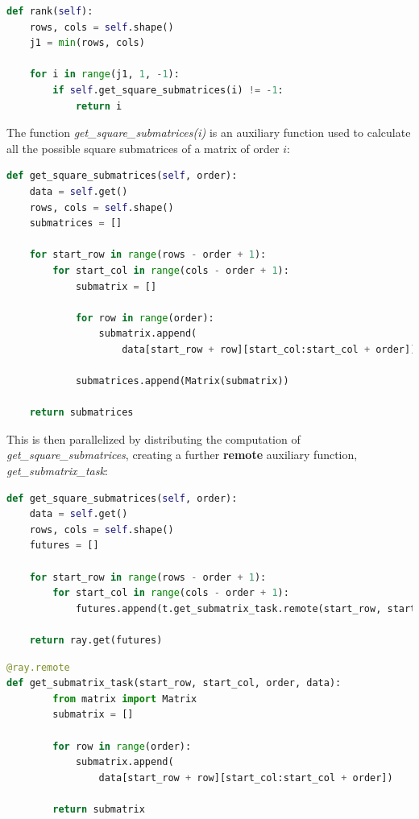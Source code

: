 \begin{lstlisting}[language=Python, caption={Rank function}]
def rank(self):
    rows, cols = self.shape()
    j1 = min(rows, cols)

    for i in range(j1, 1, -1):
        if self.get_square_submatrices(i) != -1:
            return i    
\end{lstlisting}
The function \textit{get\_square\_submatrices(i)} is an auxiliary function used to calculate all the possible square submatrices of a matrix of order $i$:
\begin{lstlisting}[language=Python, caption={get\_square\_submatrices}]
def get_square_submatrices(self, order):
    data = self.get()
    rows, cols = self.shape()
    submatrices = []

    for start_row in range(rows - order + 1):
        for start_col in range(cols - order + 1):
            submatrix = []

            for row in range(order):
                submatrix.append(
                    data[start_row + row][start_col:start_col + order])

            submatrices.append(Matrix(submatrix))

    return submatrices
\end{lstlisting}
This is then parallelized by distributing the computation of \textit{get\_square\_submatrices},  creating a further \textbf{remote} auxiliary function, \textit{get\_submatrix\_task}:
\begin{lstlisting}[language=Python, caption={get\_square\_submatrices}]
def get_square_submatrices(self, order):
    data = self.get()
    rows, cols = self.shape()
    futures = []

    for start_row in range(rows - order + 1):
        for start_col in range(cols - order + 1):            
            futures.append(t.get_submatrix_task.remote(start_row, start_col, order, data))

    return ray.get(futures)
\end{lstlisting}

\begin{lstlisting}[language=Python, caption={get\_submatrix\_task}]
@ray.remote
def get_submatrix_task(start_row, start_col, order, data):
        from matrix import Matrix
        submatrix = []

        for row in range(order):
            submatrix.append(
                data[start_row + row][start_col:start_col + order])
            
        return submatrix
\end{lstlisting}

